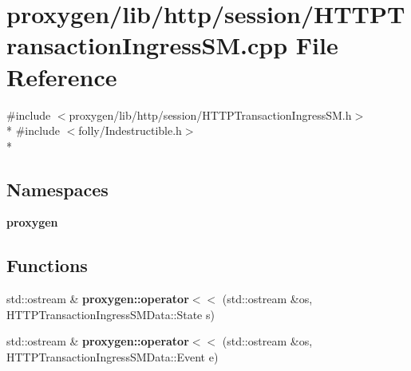 \section{proxygen/lib/http/session/\+H\+T\+T\+P\+Transaction\+Ingress\+SM.cpp File Reference}
\label{HTTPTransactionIngressSM_8cpp}
{\ttfamily \#include $<$proxygen/lib/http/session/\+H\+T\+T\+P\+Transaction\+Ingress\+S\+M.\+h$>$}\\*
{\ttfamily \#include $<$folly/\+Indestructible.\+h$>$}\\*
\subsection*{Namespaces}
\begin{DoxyCompactItemize}
\item 
 {\bf proxygen}
\end{DoxyCompactItemize}
\subsection*{Functions}
\begin{DoxyCompactItemize}
\item 
std\+::ostream \& {\bf proxygen\+::operator$<$$<$} (std\+::ostream \&os, H\+T\+T\+P\+Transaction\+Ingress\+S\+M\+Data\+::\+State s)
\item 
std\+::ostream \& {\bf proxygen\+::operator$<$$<$} (std\+::ostream \&os, H\+T\+T\+P\+Transaction\+Ingress\+S\+M\+Data\+::\+Event e)
\end{DoxyCompactItemize}
